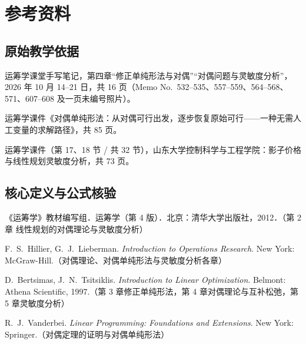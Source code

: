 \section*{参考资料}

\subsection*{原始教学依据}
\begin{enumerate}[label={[\arabic*]},leftmargin=2.2em]
  \item 运筹学课堂手写笔记，第四章“修正单纯形法与对偶”“对偶问题与灵敏度分析”，2026 年 10 月 14--21 日，共 16 页（Memo No.~532--535、557--559、564--568、571、607--608 及一页未编号照片）。
  \item 运筹学课件《对偶单纯形法：从对偶可行出发，逐步恢复原始可行——一种无需人工变量的求解路径》，共 85 页。
  \item 运筹学课件（第 17、18 节 / 共 32 节），山东大学控制科学与工程学院：影子价格与线性规划灵敏度分析，共 73 页。
\end{enumerate}

\subsection*{核心定义与公式核验}
\begin{enumerate}[label={[\arabic*]},leftmargin=2.2em,resume]
  \item 《运筹学》教材编写组．运筹学（第 4 版）．北京：清华大学出版社，2012．（第 2 章 线性规划的对偶理论与灵敏度分析）
  \item F.~S.~Hillier, G.~J.~Lieberman. \emph{Introduction to Operations Research}. New York: McGraw-Hill.（对偶理论、对偶单纯形法与灵敏度分析各章）
  \item D.~Bertsimas, J.~N.~Tsitsiklis. \emph{Introduction to Linear Optimization}. Belmont: Athena Scientific, 1997.（第 3 章修正单纯形法，第 4 章对偶理论与互补松弛，第 5 章灵敏度分析）
  \item R.~J.~Vanderbei. \emph{Linear Programming: Foundations and Extensions}. New York: Springer.（对偶定理的证明与对偶单纯形法）
\end{enumerate}


